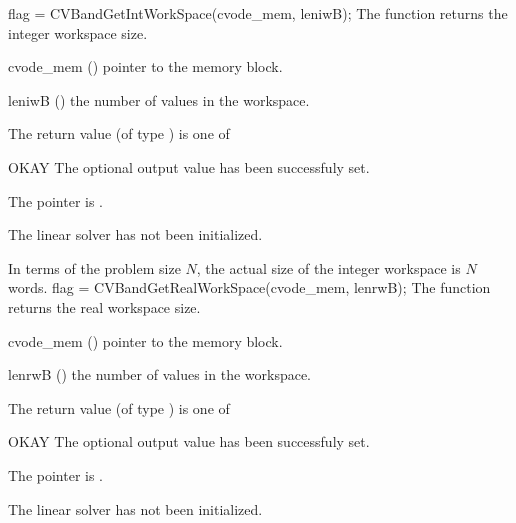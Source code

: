 %
%
{
  flag = CVBandGetIntWorkSpace(cvode\_mem, leniwB);
}
{
  The function  returns the
  {\cvband} integer workspace size.
}
{
  \begin{args}
  \item[cvode\_mem] ()
    pointer to the {\cvodes} memory block.
  \item[leniwB] ()
    the number of  values in the {\cvband} workspace.
  \end{args}
}
{
  The return value  (of type ) is one of
  \begin{args}
  \item[OKAY] 
    The optional output value has been successfuly set.
  \item[\Id{LIN\_NO\_MEM}]
    The  pointer is .
  \item[\Id{LIN\_NO\_LMEM}]
    The {\cvband} linear solver has not been initialized.
  \end{args}
}
{
  In terms of the problem size $N$, the actual size of the integer workspace
  is $N$  words.
}
{
  flag = CVBandGetRealWorkSpace(cvode\_mem, lenrwB);
}
{
  The function  returns the
  {\cvband} real workspace size.
}
{
  \begin{args}
  \item[cvode\_mem] ()
    pointer to the {\cvodes} memory block.
  \item[lenrwB] ()
    the number of  values in the {\cvband} workspace.
  \end{args}
}
{
  The return value  (of type ) is one of
  \begin{args}
  \item[OKAY] 
    The optional output value has been successfuly set.
  \item[\Id{LIN\_NO\_MEM}]
    The  pointer is .
  \item[\Id{LIN\_NO\_LMEM}]
    The {\cvband} linear solver has not been initialized.
  \end{args}
}
